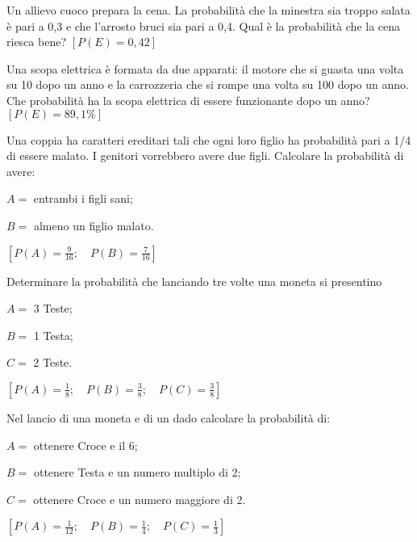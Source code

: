 \begin{esercizio}[\Ast]
 \label{ese:9.53}
Un allievo cuoco prepara la cena. La probabilità che la minestra sia troppo 
salata è pari a 0,3 e che l'arrosto bruci sia pari a 0,4. Qual è la probabilità 
che la cena riesca bene?
\hfill $\left[P(E)=0,42\right]$
\end{esercizio}

\begin{esercizio}[\Ast]
 \label{ese:9.54}
Una scopa elettrica è formata da due apparati: il motore che si guasta una volta 
su 10 dopo un anno e la carrozzeria che si rompe una volta su 100 dopo un anno. 
Che probabilità ha la scopa elettrica di essere funzionante dopo un anno?
\hfill $\left[P(E)=89,1\%\right]$
\end{esercizio}

\begin{esercizio}[\Ast]
 \label{ese:9.55}
Una coppia ha caratteri ereditari tali che ogni loro figlio ha probabilità pari 
a 1/4 di essere malato. I genitori vorrebbero avere due figli. Calcolare la 
probabilità di avere:
\begin{itemize*}
\item $ A= $ entrambi i figli sani;
\item $ B= $ almeno un figlio malato.
\end{itemize*}
\hfill $\left[P(A)=\frac 9 {16}; \quad P(B)=\frac 7 {16}\right]$
\end{esercizio}

\begin{esercizio}[\Ast]
 \label{ese:9.56}
Determinare la probabilità che lanciando tre volte una moneta si presentino
\begin{itemize*}
\item $ A= $ 3 Teste;
\item $ B= $ 1 Testa;
\item $ C= $ 2 Teste.
\end{itemize*}
\hfill $\left[P(A)=\frac 1 8; \quad P(B)=\frac3 8; \quad P(C)=\frac 3 8\right]$
\end{esercizio}

\begin{esercizio}[\Ast]
 \label{ese:9.57}
Nel lancio di una moneta e di un dado calcolare la probabilità di:
\begin{itemize*}
\item $ A= $ ottenere Croce e il 6;
\item $ B= $ ottenere Testa e un numero multiplo di 2;
\item $ C= $ ottenere Croce e un numero maggiore di 2.
\end{itemize*}
\hfill $\left[P(A)=\frac 1 {12}; \quad P(B)=\frac1 4; \quad 
P(C)=\frac 1 3\right]$
\end{esercizio}

